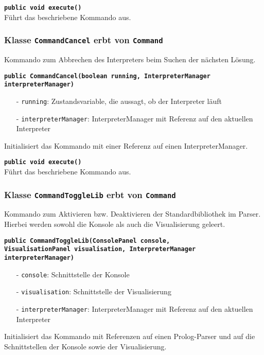 \documentclass[parskip=full,11pt,twoside]{scrartcl}
\begin{document}
\textbf{\texttt{public void execute()}}\\
Führt das beschriebene Kommando aus.

\subsubsection{Klasse \texttt{CommandCancel} erbt von \texttt{Command}}

Kommando zum Abbrechen des Interpreters beim Suchen der nächsten Lösung.

\textbf{\texttt{public CommandCancel(boolean running, InterpreterManager\\interpreterManager)}}
\begin{itemize}[noitemsep]
    \item[-] \texttt{running}: Zustandsvariable, die aussagt, ob der Interpreter läuft
	\item[-] \texttt{interpreterManager}: InterpreterManager mit Referenz auf den aktuellen Interpreter
\end{itemize}
Initialisiert das Kommando mit einer Referenz auf einen InterpreterManager.

\textbf{\texttt{public void execute()}}\\
Führt das beschriebene Kommando aus.

\subsubsection{Klasse \texttt{CommandToggleLib} erbt von \texttt{Command}}

Kommando zum Aktivieren bzw. Deaktivieren der Standardbibliothek im Parser. Hierbei werden sowohl die Konsole als auch die Visualisierung geleert.

\textbf{\texttt{public CommandToggleLib(ConsolePanel console,\\VisualisationPanel visualisation, InterpreterManager interpreterManager)}}
\begin{itemize}[noitemsep]
	\item[-] \texttt{console}: Schnittstelle der Konsole
	\item[-] \texttt{visualisation}: Schnittstelle der Visualisierung
	\item[-] \texttt{interpreterManager}: InterpreterManager mit Referenz auf den aktuellen Interpreter
\end{itemize}
Initialisiert das Kommando mit Referenzen auf einen Prolog-Parser und auf die Schnittstellen der Konsole sowie der Visualisierung.
\end{document}
